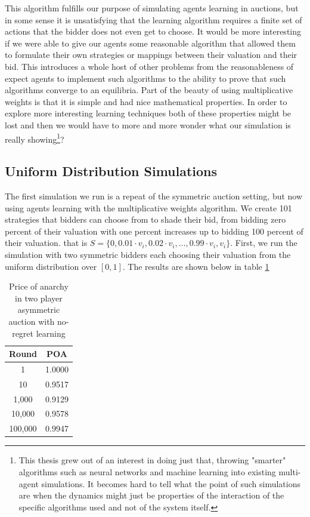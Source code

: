 \documentclass[12pt,twoside]{reedthesis}
\begin{document}
This algorithm fulfills our purpose of simulating agents learning in auctions, but in some sense it is unsatisfying that the learning algorithm requires a finite set of actions that the bidder does not even get to choose. It would be more interesting if we were able to give our agents some reasonable algorithm that allowed them to formulate their own strategies or mappings between their valuation and their bid. This introduces a whole host of other problems from the reasonableness of expect agents to implement such algorithms to the ability to prove that such algorithms converge to an equilibria. Part of the beauty of using multiplicative weights is that it is simple and had nice mathematical properties. In order to explore more interesting learning techniques both of these properties might be lost and then we would have to more and more wonder what our simulation is really showing\footnote{This thesis grew out of an interest in doing just that, throwing "smarter" algorithms such as neural networks and machine learning into existing multi-agent simulations. It becomes hard to tell what the point of such simulations are when the dynamics might just be properties of the interaction of the specific algorithms used and not of the system itself.}?

\subsection{Uniform Distribution Simulations}
The first simulation we run is a repeat of the symmetric auction setting, but now using agents learning with the multiplicative weights algorithm. We create 101 strategies that bidders can choose from to shade their bid, from bidding zero percent of their valuation with one percent increases up to bidding 100 percent of their valuation. that is $S = \{ 0, 0.01 \cdot v_i, 0.02 \cdot v_i, \ldots, 0.99 \cdot v_i, v_i \}$. First, we run the simulation with two symmetric bidders each choosing their valuation from the uniform distribution over $[0,1]$. The results are shown below in table \ref{table:3}

\begin{table}[h!]
	\begin{center}
		\begin{tabular}{ |c|c| }
			\hline
			Round & POA \\
			\hline
			1 & 1.0000 \\
			10 & 0.9517 \\
			1,000 & 0.9129 \\
			10,000 & 0.9578 \\
			100,000 & 0.9947 \\
			\hline
		\end{tabular}
		\caption{Price of anarchy in two player asymmetric auction with no-regret learning}
		\label{table:3}
	\end{center} 
\end{table}
\end{document}
